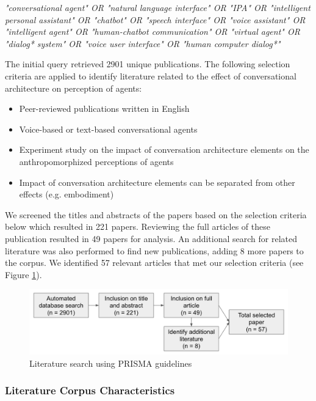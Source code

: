 \documentclass[sigconf,screen,review, anonymous]{acmart}
\begin{document}
\textit{"conversational agent" OR "natural language interface" OR "IPA" OR "intelligent personal assistant" OR "chatbot" OR "speech interface" OR "voice assistant" OR "intelligent agent" OR "human-chatbot communication" OR "virtual agent" OR "dialog* system" OR "voice user interface" OR "human computer dialog*"}
\newline

The initial query retrieved 2901 unique publications. The following selection criteria are applied to identify literature related to the effect of conversational architecture on perception of agents:
\begin{itemize}
  \item Peer-reviewed publications written in English
  \item Voice-based or text-based conversational agents
  \item Experiment study on the impact of conversation architecture elements on the anthropomorphized perceptions of agents
  \item Impact of conversation architecture elements can be separated from other effects (e.g. embodiment)

\end{itemize}

We screened the titles and abstracts of the papers based on the selection criteria below which resulted in 221 papers. Reviewing the full articles of these publication resulted in 49 papers for analysis. An additional search for related literature was also performed to find new publications, adding 8 more papers to the corpus. We identified 57 relevant articles that met our selection criteria (see Figure \ref{fig:prisma}).

\begin{figure}[h]
  \centering
  \includegraphics[width=1\columnwidth]{fig-prisma.png}
  \caption{Literature search using PRISMA guidelines}
  \label{fig:prisma}
\end{figure}

\subsubsection*{Literature Corpus Characteristics}
\end{document}
